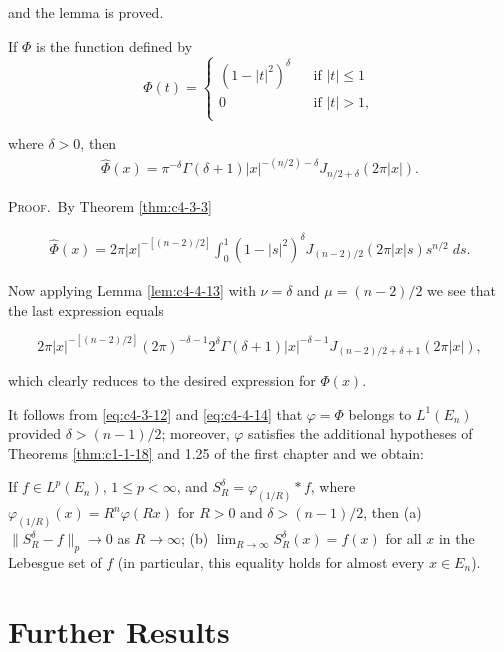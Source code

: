 and the lemma is proved.

\begin{theorem}
\label{thm:c4-4-15}
If $\Phi$ is the function defined by
\[
\Phi(t)=\left\{\begin{matrix}{(1-|t|^{2})^{\delta}}&{}&{\text{if }|t|\leq1}\\ {0}&{}&{\text{if }|t|>1,}\\ \end{matrix}\right.
\]

where $\delta>0$, then
\[
\begin{array}{r}{\hat{\Phi}(x)=\pi^{-\delta}\Gamma(\delta+1)|x|^{-(n/2)-\delta}J_{n/2+\delta}(2\pi|x|).}\end{array}
\]

\end{theorem}

\textsc{Proof.}\ By Theorem \ref{thm:c4-3-3}

\[
\begin{array}{r}{\hat{\Phi}(x)=2\pi|x|^{-[(n-2)/2]}\displaystyle\int_{0}^{1}(1-|s|^{2})^{\delta}J_{(n-2)/2}(2\pi|x|s)s^{n/2}\;d s.}\end{array}
\]

Now applying Lemma \ref{lem:c4-4-13} with $\nu = \delta$ and $\mu = (n - 2)/2$ we see that the last expression equals

\[
2\pi|x|^{-[(n-2)/2]}(2\pi)^{-\delta-1}2^{\delta}\Gamma(\delta+1)|x|^{-\delta-1}J_{(n-2)/2+\delta+1}(2\pi|x|),
\]

which clearly reduces to the desired expression for $\Phi(x)$.

It follows from \eqref{eq:c4-3-12} and \eqref{eq:c4-4-14} that $\varphi = \Phi$ belongs to $L^1(E_n)$ provided $\delta > (n - 1)/2$; moreover, $\varphi$ satisfies the additional hypotheses of Theorems \ref{thm:c1-1-18} and 1.25 of the first chapter and we obtain:

\begin{corollary}
\label{cor:c4-4-16}
If $f \in L^p(E_n)$, $1 \leq p < \infty$, and $S_R^\delta = \varphi_{(1/R)} * f$, where $\varphi_{(1/R)}(x) = R^n \varphi(Rx)$ for $R > 0$ and $\delta > (n - 1)/2$, then
(a) $\|S_R^\delta - f\|_p \to 0$ as $R \to \infty$;
(b) $\lim_{R \to \infty} S_R^\delta(x) = f(x)$ for all $x$ in the Lebesgue set of $f$ (in particular, this equality holds for almost every $x \in E_n$).
\end{corollary}

\section{Further Results}

